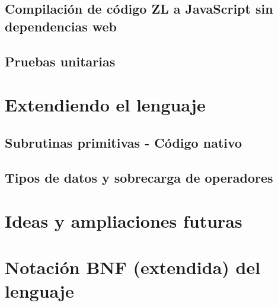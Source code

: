 \documentclass{report}
\begin{document}
	\section{Compilación de código ZL a JavaScript sin dependencias web}
	
	\section{Pruebas unitarias}
	
	\chapter{Extendiendo el lenguaje}
	
	\section{Subrutinas primitivas - Código nativo}
	
	\section{Tipos de datos y sobrecarga de operadores} 
	
	\chapter{Ideas y ampliaciones futuras} 

\fi	

	\appendix
	\chapter{Notación BNF (extendida) del lenguaje} \label{app:a}
	
	
\end{document}

